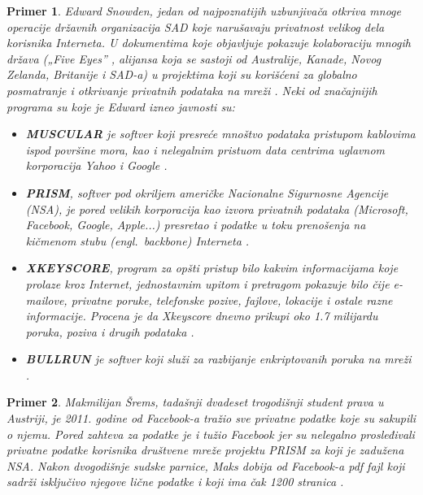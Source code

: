 \documentclass[a4paper]{article}
\newtheorem{primer}{Primer}[section]
\begin{document}
\begin{primer}
Edward Snowden, jedan od najpoznatijih uzbunjivača otkriva mnoge operacije državnih organizacija SAD koje narušavaju privatnost velikog dela korisnika Interneta. U dokumentima koje objavljuje pokazuje kolaboraciju mnogih država („Five Eyes” , alijansa koja se sastoji od Australije, Kanade, Novog Zelanda, Britanije i SAD-a) u projektima koji su korišćeni za globalno posmatranje i otkrivanje privatnih podataka na mreži \cite{noPlaceToHide}. Neki od značajnijih programa su koje je Edward izneo javnosti su:
\begin{itemize}
\item \textbf{MUSCULAR} je softver koji presreće mnoštvo podataka pristupom kablovima ispod površine mora, kao i nelegalnim pristuom data centrima uglavnom korporacija Yahoo i Google \cite{noPlaceToHide}.
\item \textbf{PRISM}, softver pod okriljem američke Nacionalne Sigurnosne Agencije (NSA), je pored velikih korporacija kao izvora privatnih podataka (Microsoft, Facebook, Google, Apple...) presretao i podatke u toku prenošenja na kičmenom stubu (engl.~{\em backbone}) Interneta \cite{noPlaceToHide}.
\item \textbf{XKEYSCORE}, program za opšti pristup bilo kakvim informacijama koje prolaze kroz Internet, jednostavnim upitom i pretragom pokazuje bilo čije e-mailove, privatne poruke, telefonske pozive, fajlove, lokacije i ostale razne informacije. Procena je da Xkeyscore dnevno prikupi oko 1.7 milijardu poruka, poziva i drugih podataka \cite{noPlaceToHide}.
\item \textbf{BULLRUN} je softver koji služi za razbijanje enkriptovanih poruka na mreži \cite{noPlaceToHide}.
\end{itemize}
\end{primer}

\begin{primer}
Makmilijan Šrems, tadašnji dvadeset trogodišnji student prava u
Austriji, je 2011. godine od Facebook-a tražio sve privatne podatke koje su sakupili o njemu. Pored zahteva za podatke je i tužio Facebook jer su nelegalno prosleđivali privatne podatke korisnika društvene mreže projektu PRISM\cite{noPlaceToHide} za koji je zadužena NSA. Nakon dvogodišnje sudske parnice, Maks dobija od Facebook-a pdf fajl koji sadrži isključivo njegove lične podatke i koji ima čak 1200 stranica \cite{marxSchremsFT}.
\end{primer}
\end{document}
